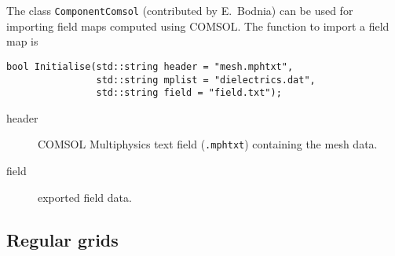 The class \texttt{ComponentComsol} (contributed by E.~Bodnia) can be used for 
importing field maps computed using COMSOL.
The function to import a field map is 
\begin{lstlisting}
bool Initialise(std::string header = "mesh.mphtxt",
                std::string mplist = "dielectrics.dat",
                std::string field = "field.txt");
\end{lstlisting}
\begin{description}
  \item[header] COMSOL Multiphysics text field (\texttt{.mphtxt}) containing the mesh data.
  \item[field] exported field data. 
\end{description}

\subsection{Regular grids}

